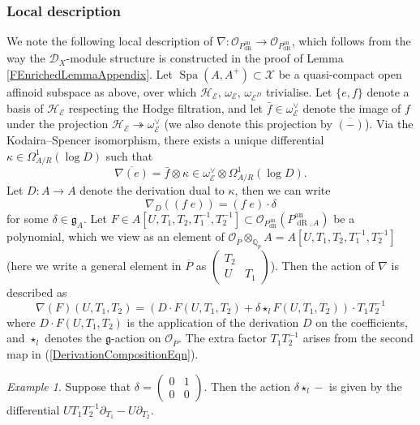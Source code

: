 \documentclass[10pt, oneside]{amsart}
\numberwithin{equation}{subsection}
\theoremstyle{definition}
\theoremstyle{remark}
\newtheorem{example}[equation]{Example}
\newcommand{\mbb}[1]{\mathbb{#1}}
\newcommand{\opn}[1]{\operatorname{#1}}
\newcommand{\tbyt}[4]{\left( \begin{matrix} #1 & #2 \\ #3 & #4 \end{matrix} \right)}
\begin{document}
\subsubsection{Local description} \label{LocalDescriptionOfGM}

We note the following local description of $\nabla \colon \mathcal{O}_{P_{\opn{dR}}^{\opn{an}}} \to \mathcal{O}_{P_{\opn{dR}}^{\opn{an}}}$, which follows from the way the $\mathcal{D}_X$-module structure is constructed in the proof of Lemma \ref{FEnrichedLemmaAppendix}. Let $\opn{Spa}(A, A^+) \subset \mathcal{X}$ be a quasi-compact open affinoid subspace as above, over which $\mathcal{H}_{\mathcal{E}}$, $\omega_{\mathcal{E}}$, $\omega_{\mathcal{E}^D}$ trivialise. Let $\{ e, f \}$ denote a basis of $\mathcal{H}_{\mathcal{E}}$ respecting the Hodge filtration, and let $\bar{f} \in \omega_{\mathcal{E}}^{\vee}$ denote the image of $f$ under the projection $\mathcal{H}_{\mathcal{E}} \twoheadrightarrow \omega_{\mathcal{E}}^{\vee}$ (we also denote this projection by $\overline{(-)}$). Via the Kodaira--Spencer isomorphism, there exists a unique differential $\kappa \in \Omega^1_{A/R}(\opn{log}D)$ such that
\[
\overline{\nabla(e)} = \bar{f} \otimes \kappa \in \omega_{\mathcal{E}}^{\vee} \otimes \Omega^1_{A/R}(\opn{log}D) .
\]
Let $D \colon A \to A$ denote the derivation dual to $\kappa$, then we can write 
\[
\nabla_D( (f \; e) ) = (f \; e) \cdot \delta 
\]
for some $\delta \in \mathfrak{g}_A$. Let $F \in A[U, T_1, T_2, T_1^{-1}, T_2^{-1}] \subset \mathcal{O}_{P_{\opn{dR}}^{\opn{an}}}(P_{\opn{dR}, A}^{\opn{an}})$ be a polynomial, which we view as an element of $\mathcal{O}_{\overline{P}} \otimes_{\mbb{Q}_p} A = A[U, T_1, T_2, T_1^{-1}, T_2^{-1}]$ (here we write a general element in $\overline{P}$ as $\tbyt{T_2}{}{U}{T_1}$). Then the action of $\nabla$ is described as 
\[
\nabla(F)(U, T_1, T_2) = \left( D \cdot F(U, T_1, T_2) + \delta \star_l F(U, T_1, T_2) \right) \cdot T_1 T_2^{-1} 
\]
where $D \cdot F(U, T_1, T_2)$ is the application of the derivation $D$ on the coefficients, and $\star_l$ denotes the $\mathfrak{g}$-action on $\mathcal{O}_{\overline{P}}$. The extra factor $T_1T_2^{-1}$ arises from the second map in (\ref{DerivationCompositionEqn}).

\begin{example} \label{ExampleInNilpotentBasis}
Suppose that $\delta = \tbyt{0}{1}{0}{0}$. Then the action $\delta \star_l -$ is given by the differential $U T_1 T_2^{-1} \partial_{T_1} - U \partial_{T_2}$. 
\end{example}
\end{document}
